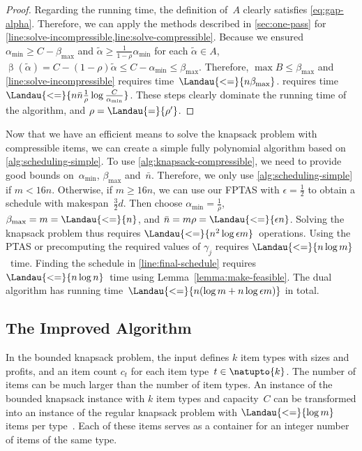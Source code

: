 \begin{proof}
  Regarding the running time,
  the definition of~$A$ clearly satisfies \cref{eq:gap-alpha}.
  Therefore, we can apply the methods described in \cref{sec:one-pass}
  for \cref{line:solve-incompressible,line:solve-compressible}.
  Because we ensured $\alpha_{\min} \geq C - \beta_{\max}$
  and $\tilde{\alpha} \geq \frac{1}{1-\rho} \alpha_{\min}$ for each $\tilde{\alpha} \in A$,
  $\mathop{\beta}(\tilde{\alpha}) = C - (1-\rho) \tilde{\alpha} \leq C - \alpha_{\min} \leq \beta_{\max}$.
  Therefore, $\max B \leq \beta_{\max}$
  and \cref{line:solve-incompressible} requires time~$\Landau{<=}{n \beta_{\max}}$.
   requires time~$\Landau{<=}{n \bar{n} \frac{1}{\rho} \log \frac{C}{\alpha_{\min}}}$.
  These steps clearly dominate the running time of the algorithm,
  and $\rho = \Landau{=}{\rho'}$.
\end{proof}


Now that we have an efficient means to solve the knapsack problem with compressible items,
we can create a simple fully polynomial algorithm based on \cref{alg:scheduling-simple}.
To use \cref{alg:knapsack-compressible},
we need to provide good bounds on~$\alpha_{\min}$, $\beta_{\max}$ and~$\bar{n}$.
Therefore, we only use \cref{alg:scheduling-simple} if $m < 16 n$.
Otherwise, if $m \geq 16 n$, we can use our FPTAS with $\epsilon = \frac{1}{2}$
to obtain a schedule with makespan~$\frac{3}{2} d$.
Then choose $\alpha_{\min} = \frac{1}{\rho}$, $\beta_{\max} = m = \Landau{<=}{n}$,
and $\bar{n} = m \rho = \Landau{<=}{\epsilon n}$.
Solving the knapsack problem thus requires $\Landau{<=}{n^2 \log \epsilon m}$~operations.
Using the PTAS or precomputing the required values of $\gamma_j$ requires $\Landau{<=}{n \log m}$~time.
Finding the schedule in \cref{line:final-schedule} requires $\Landau{<=}{n \log n}$~time
using Lemma~\ref{lemma:make-feasible}.
The dual algorithm has running time~$\Landau{<=}{n (\log m + n \log \epsilon m)}$ in total.


\subsection{The Improved Algorithm}
\label{sec:bounded-kp}

In the bounded knapsack problem, the input defines $k$ item types with sizes and profits,
and an item count $c_t$ for each item type~$t \in \natupto{k}$.
The number of items can be much larger than the number of item types.
An instance of the bounded knapsack instance with $k$ item types and capacity~$C$
can be transformed into an instance of the regular knapsack problem
with $\Landau{<=}{\log m}$ items per type~\cite{kellerer04}.
Each of these items serves as a container for an integer number
of items of the same type.

